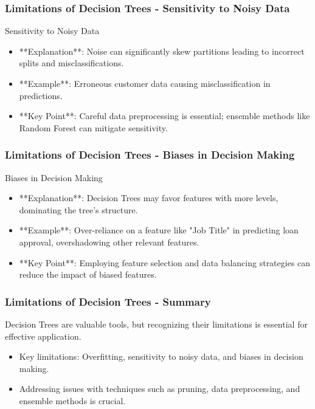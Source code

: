 \documentclass[aspectratio=169]{beamer}
\begin{document}
\begin{frame}[fragile]
    \frametitle{Limitations of Decision Trees - Sensitivity to Noisy Data}
    \begin{block}{Sensitivity to Noisy Data}
        \begin{itemize}
            \item **Explanation**: Noise can significantly skew partitions leading to incorrect splits and misclassifications.
            \item **Example**: Erroneous customer data causing misclassification in predictions.
            \item **Key Point**: Careful data preprocessing is essential; ensemble methods like Random Forest can mitigate sensitivity.
        \end{itemize}
    \end{block}
\end{frame}

\begin{frame}[fragile]
    \frametitle{Limitations of Decision Trees - Biases in Decision Making}
    \begin{block}{Biases in Decision Making}
        \begin{itemize}
            \item **Explanation**: Decision Trees may favor features with more levels, dominating the tree's structure.
            \item **Example**: Over-reliance on a feature like "Job Title" in predicting loan approval, overshadowing other relevant features.
            \item **Key Point**: Employing feature selection and data balancing strategies can reduce the impact of biased features.
        \end{itemize}
    \end{block}
\end{frame}

\begin{frame}[fragile]
    \frametitle{Limitations of Decision Trees - Summary}
    Decision Trees are valuable tools, but recognizing their limitations is essential for effective application.
    
    \begin{itemize}
        \item Key limitations: Overfitting, sensitivity to noisy data, and biases in decision making.
        \item Addressing issues with techniques such as pruning, data preprocessing, and ensemble methods is crucial.
    \end{itemize}
\end{frame}
\end{document}
